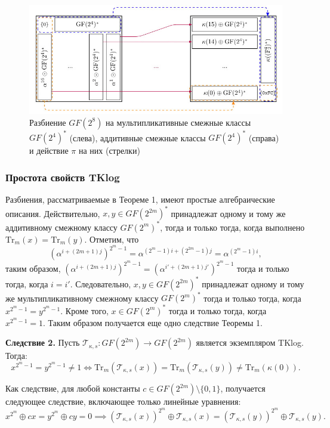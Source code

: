 \begin{figure}
  \centering
  \includegraphics[scale=0.7]{contents/pics/cosets.png}
  \caption{Разбиение $GF(2^8)$ на мультипликативные смежные классы $GF(2^4)^*$ (слева), аддитивные смежные классы $GF(2^4)^*$ (справа) и действие $\pi$ на них (стрелки)}
  \label{fig:fig02}
\end{figure}

\subsubsection{Простота свойств TKlog}
Разбиения, рассматриваемые в Теореме 1, имеют простые алгебраические описания. Действительно,
\( x, y \in GF(2^{2m})^{\ast} \) принадлежат одному и тому же аддитивному смежному классу \( GF(2^m)^{\ast} \), тогда и только тогда, когда выполнено \( \text{Tr}_m(x) = \text{Tr}_m(y) \).
Отметим, что
\[
\left(\alpha^{i+(2m+1)j}\right)^{2^m-1} = \alpha^{(2^m-1)i+(2^{2m}-1)j} = \alpha^{(2^m-1)i},
\]
таким образом, $\left(\alpha^{i+(2m+1)j}\right)^{2^m-1} = \left(\alpha^{i'+(2m+1)j'}\right)^{2^m-1}$ тогда и только тогда, когда \( i = i' \). Следовательно, \( x, y \in GF(2^{2m})^{\ast} \) принадлежат одному и тому же мультипликативному смежному классу \( GF(2^m)^{\ast} \) тогда и только тогда, когда \( x^{2^m-1} = y^{2^m-1} \). Кроме того, \( x \in GF(2^m)^{\ast} \) тогда и только тогда, когда \( x^{2^m-1} = 1 \). Таким образом получается еще одно следствие Теоремы 1.

\textbf{Следствие 2.} Пусть \( \mathscr{T}_{\kappa,s} : GF(2^{2m}) \to GF(2^{2m}) \) является экземпляром TKlog. Тогда:
\[
x^{2^m-1} = y^{2^m-1} \neq 1 \Leftrightarrow \text{Tr}_m(\mathscr{T}_{\kappa,s}(x)) = \text{Tr}_m(\mathscr{T}_{\kappa,s}(y)) \neq \text{Tr}_m(\kappa(0)).
\]

Как следствие, для любой константы \( c \in GF(2^{2m}) \setminus \{0, 1\} \), получается следующее следствие, включающее только линейные уравнения:
\[
x^{2^m} \oplus cx = y^{2^m} \oplus cy = 0 \implies (\mathscr{T}_{\kappa,s}(x))^{2^m} \oplus \mathscr{T}_{\kappa,s}(x) = (\mathscr{T}_{\kappa,s}(y))^{2^m} \oplus \mathscr{T}_{\kappa,s}(y).
\]

